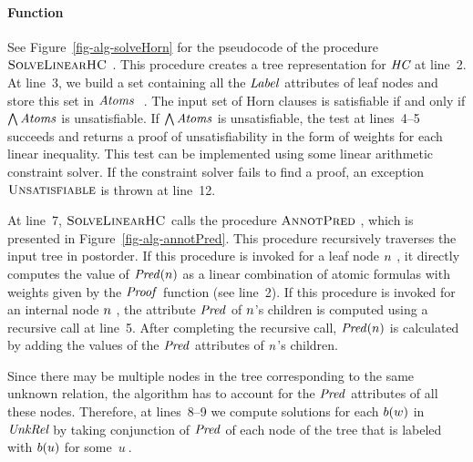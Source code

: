 \paragraph{Function \algSolveLinearHornClauses}
See Figure~\ref{fig-alg-solveHorn} for the pseudocode of the procedure
$\textsc{SolveLinearHC}\ $.
This procedure creates a tree representation for $\textit{HC}$ at line~2.
At line~3, we build a set containing all the $\mathit{Label}$ attributes of
leaf nodes and store this set in $\mathit{Atoms}\ $ .
The input set of Horn clauses is satisfiable if and only if
$\bigwedge \mathit{Atoms}$ is unsatisfiable.
If $\bigwedge \mathit{Atoms}$ is unsatisfiable, the test at lines~4--5 succeeds
and returns a proof of unsatisfiability in the form of weights for
each linear inequality. 
This test can be implemented using some linear arithmetic constraint
solver.
If the constraint solver fails to find a proof, an exception
$\textsc{Unsatisfiable}$ is thrown at line~12.

At line~7, $\textsc{SolveLinearHC}$ calls the procedure
$\textsc{AnnotPred}\ $, which is presented in Figure~\ref{fig-alg-annotPred}.
This procedure recursively traverses the input tree in postorder.
If this procedure is invoked for a leaf node $\cnode\ $, it directly
computes the value of $\mathit{Pred}(n)$ as a linear combination
of atomic formulas with weights given by the $\mathit{Proof}$ function (see
line~2).
If this procedure is invoked for an internal node $\cnode\ $, the
attribute $\mathit{Pred}$ of $n$'s children is computed using a
recursive call at line~5.
After completing the recursive call, $\mathit{Pred}(n)$ is
calculated by adding the values of the $\mathit{Pred}$ attributes of
$n$'s children.

Since there may be multiple nodes in the tree corresponding to the
same unknown relation, the algorithm has to account for the
$\mathit{Pred}$ attributes of all these nodes.
Therefore, at lines~8--9 we compute solutions for each
$b(w)$ in $\textit{UnkRel}$ by taking conjunction of
$\mathit{Pred}$ of each node of the tree that is labeled with
$b(u)$ for some~$u\ $.



